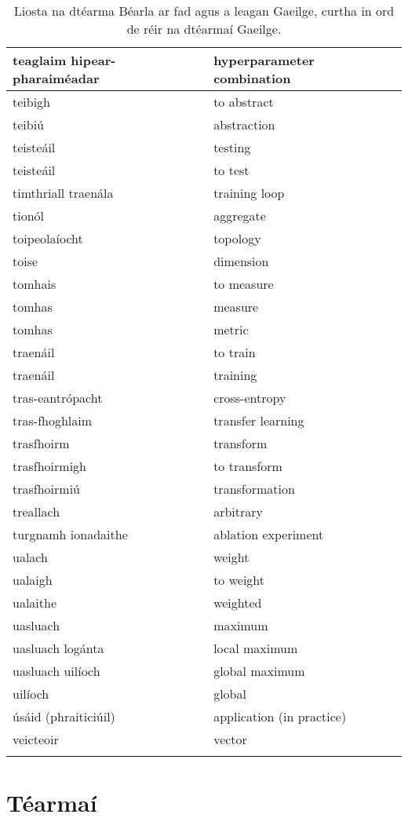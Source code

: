 \documentclass{article}
\begin{document}
\begin{longtable}{|l|l|}
		teaglaim hipear-pharaiméadar&hyperparameter combination\\ \hline 
		teibigh&to abstract\\ \hline 
		teibiú&abstraction\\ \hline 
		teisteáil&testing\\ \hline 
		teisteáil&to test\\ \hline 
		timthriall traenála&training loop\\ \hline 
		tionól&aggregate\\ \hline 
		toipeolaíocht&topology\\ \hline 
		toise&dimension\\ \hline 
		tomhais&to measure\\ \hline 
		tomhas&measure\\ \hline 
		tomhas&metric\\ \hline 
		traenáil&to train\\ \hline 
		traenáil&training\\ \hline 
		tras-eantrópacht&cross-entropy\\ \hline 
		tras-fhoghlaim&transfer learning\\ \hline 
		trasfhoirm&transform\\ \hline 
		trasfhoirmigh&to transform\\ \hline 
		trasfhoirmiú&transformation\\ \hline 
		treallach&arbitrary\\ \hline 
		turgnamh ionadaithe&ablation experiment\\ \hline 
		ualach&weight\\ \hline 
		ualaigh&to weight\\ \hline 
		ualaithe&weighted\\ \hline 
		uasluach&maximum\\ \hline 
		uasluach logánta&local maximum\\ \hline 
		uasluach uilíoch&global maximum\\ \hline 
		uilíoch&global\\ \hline 
		úsáid (phraiticiúil)&application (in practice)\\ \hline 
		veicteoir&vector\\ \hline 
\caption{Liosta na dtéarma Béarla ar fad agus a leagan Gaeilge, curtha in ord de réir na dtéarmaí Gaeilge.}
\label{tab-terms-ga-en}
\end{longtable}

\newpage \section{Téarmaí}
\end{document}
